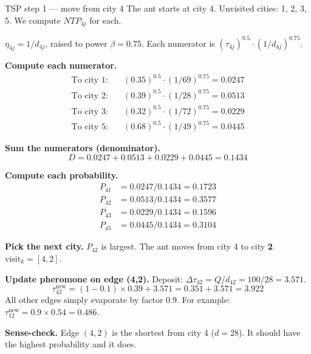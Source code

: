 \documentclass[a4paper,11pt]{article}
\begin{document}
\begin{worked}{TSP step 1 --- move from city 4}
The ant starts at city 4.
Unvisited cities: 1, 2, 3, 5.
We compute $NTP_{4j}$ for each.

$\eta_{4j} = 1/d_{4j}$, raised to power $\beta = 0.75$.
Each numerator is $(\tau_{4j})^{0.5} \cdot (1/d_{4j})^{0.75}$.

\begin{steps}
  \item \textbf{Compute each numerator.}
        \begin{align*}
          \text{To city 1:} & \quad (0.35)^{0.5} \cdot (1/69)^{0.75} = 0.0247 \\
          \text{To city 2:} & \quad (0.39)^{0.5} \cdot (1/28)^{0.75} = 0.0513 \\
          \text{To city 3:} & \quad (0.32)^{0.5} \cdot (1/72)^{0.75} = 0.0229 \\
          \text{To city 5:} & \quad (0.68)^{0.5} \cdot (1/49)^{0.75} = 0.0445
        \end{align*}

  \item \textbf{Sum the numerators (denominator).}
        \[
          D = 0.0247 + 0.0513 + 0.0229 + 0.0445 = 0.1434
        \]

  \item \textbf{Compute each probability.}
        \begin{align*}
          P_{41} &= 0.0247 / 0.1434 = 0.1723 \\
          P_{42} &= 0.0513 / 0.1434 = \mathbf{0.3577} \\
          P_{43} &= 0.0229 / 0.1434 = 0.1596 \\
          P_{45} &= 0.0445 / 0.1434 = 0.3104
        \end{align*}

  \item \textbf{Pick the next city.}
        $P_{42}$ is largest.
        The ant moves from city 4 to city \textbf{2}.
        $\text{visit}_k = [4, 2]$.

  \item \textbf{Update pheromone on edge (4,2).}
        Deposit: $\Delta\tau_{42} = Q/d_{42} = 100/28 = 3.571$.
        \[
          \tau_{42}^{\text{new}}
            = (1 - 0.1) \times 0.39 + 3.571 = 0.351 + 3.571 = \mathbf{3.922}
        \]
        All other edges simply evaporate by factor $0.9$.
        For example: $\tau_{12}^{\text{new}} = 0.9 \times 0.54 = 0.486$.

  \item \textbf{Sense-check.}
        Edge $(4,2)$ is the shortest from city 4 ($d = 28$).
        It should have the highest probability and it does.
\end{steps}
\end{worked}
\end{document}
